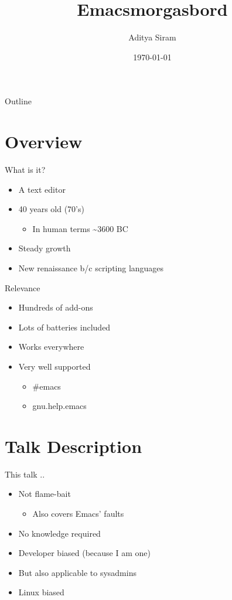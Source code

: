 \documentclass[bigger]{beamer}
\author{Aditya Siram}
\date{\today}
\title{Emacsmorgasbord}
\begin{document}
\maketitle
\begin{frame}{Outline}
\tableofcontents
\end{frame}


\section{Overview}
\label{sec-1}
\begin{frame}[label=sec-1-1]{What is it?}
\begin{itemize}
\item A text editor
\item 40 years old (70's)
\begin{itemize}
\item In human terms \textasciitilde{}3600 BC
\end{itemize}
\item Steady growth
\item New renaissance b/c scripting languages
\end{itemize}
\end{frame}

\begin{frame}[label=sec-1-2]{Relevance}
\begin{itemize}
\item Hundreds of add-ons
\item Lots of batteries included
\item Works everywhere
\item Very well supported
\begin{itemize}
\item \#emacs
\item gnu.help.emacs
\end{itemize}
\end{itemize}
\end{frame}

\section{Talk Description}
\label{sec-2}
\begin{frame}[label=sec-2-1]{This talk ..}
\begin{itemize}
\item Not flame-bait
\begin{itemize}
\item Also covers Emacs' faults
\end{itemize}
\item No knowledge required
\item Developer biased (because I am one)
\item But also applicable to sysadmins
\item Linux biased
\end{itemize}
\end{frame}
\end{document}
